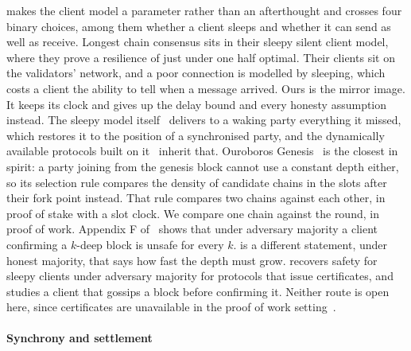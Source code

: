 \cite{cuamdr} makes the client model a parameter rather than an afterthought and
crosses four binary choices, among them whether a client sleeps and whether it
can send as well as receive. Longest chain consensus sits in their sleepy silent
client model, where they prove a resilience of just under one half optimal. Their clients sit on the validators' network, and a poor connection is modelled
by sleeping, which costs a client the ability to tell when a message arrived.
Ours is the mirror image. It keeps its clock and gives up the delay bound and
every honesty assumption instead. The sleepy model itself~\cite{sleepy}
delivers to a waking party everything it missed, which restores it to the
position of a synchronised party, and the dynamically available protocols built
on it~\cite{ebbflow,goldfish,accountability} inherit that. Ouroboros
Genesis~\cite{genesis} is the closest in spirit: a party joining from the genesis
block cannot use a constant depth either, so its selection rule compares the
density of candidate chains in the slots after their fork point instead. That rule compares two chains against each other, in proof of stake with a slot
clock. We compare one chain against the round, in proof of work. Appendix F
of~\cite{cuamdr} shows that under adversary majority a client confirming a
$k$-deep block is unsafe for every $k$.  is a different
statement, under honest majority, that says how fast the depth must grow.
\cite{bsts} recovers safety for sleepy clients under adversary majority for
protocols that issue certificates, and \cite{stubborn} studies a client that
gossips a block before confirming it. Neither route is open here, since
certificates are unavailable in the proof of work setting~\cite{lpr21}.

\paragraph{Synchrony and settlement}

